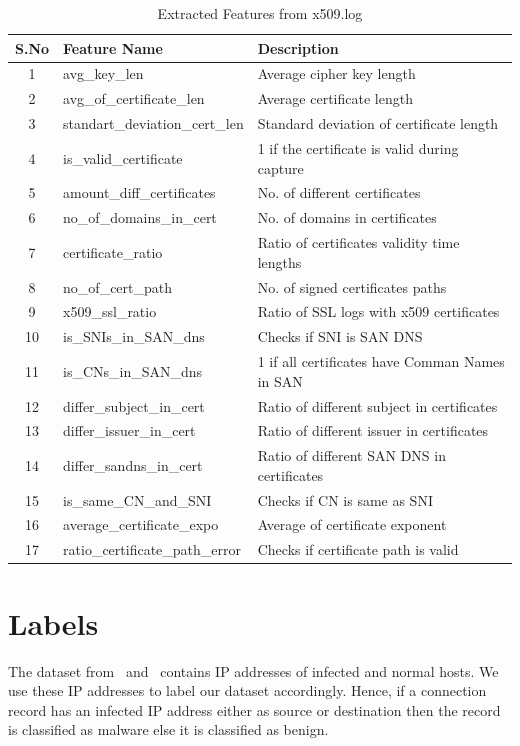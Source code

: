 \begin{table}[!htb]
	\caption{Extracted Features from x509.log\label{tab:4}}
	\begin{center}
		\begin{tabular}{c|p{}|p{}}\hline\hline
			S.No & Feature Name & \multicolumn{1}{l}{Description} \\ \hline
			1 & avg\_key\_len & Average cipher key length\\
			2 & avg\_of\_certificate\_len & Average certificate length\\
			3 & standart\_deviation\_cert\_len & Standard deviation of certificate length\\
			4 & is\_valid\_certificate & 1 if the certificate is valid during capture\\
			5 & amount\_diff\_certificates & No. of different certificates\\
			6 & no\_of\_domains\_in\_cert & No. of domains in certificates\\
			7 & certificate\_ratio & Ratio of certificates validity time lengths\\
			8 & no\_of\_cert\_path & No. of signed certificates paths\\
			9 & x509\_ssl\_ratio & Ratio of SSL logs with x509 certificates\\
			10 & is\_SNIs\_in\_SAN\_dns & Checks if SNI is SAN DNS\\
			11 & is\_CNs\_in\_SAN\_dns & 1 if all certificates have Comman Names in SAN\\
			12 & differ\_subject\_in\_cert & Ratio of different subject in certificates\\
			13 & differ\_issuer\_in\_cert & Ratio of different issuer in certificates\\
			14 & differ\_sandns\_in\_cert & Ratio of different SAN DNS in certificates\\
			15 & is\_same\_CN\_and\_SNI & Checks if CN is same as SNI\\
			16 & average\_certificate\_expo & Average of certificate exponent\\
			17 & ratio\_certificate\_path\_error & Checks if certificate path is valid\\
			\hline\hline
		\end{tabular}
	\end{center}
\end{table}

\section{Labels}

The dataset from~\cite{GarciaGSZ14} and~\cite{Erquiaga15} contains IP addresses of infected and normal hosts. We use these IP addresses to label our dataset accordingly. Hence, if a connection record has an infected IP address either as source or destination then the record is classified as malware else it is classified as benign. 